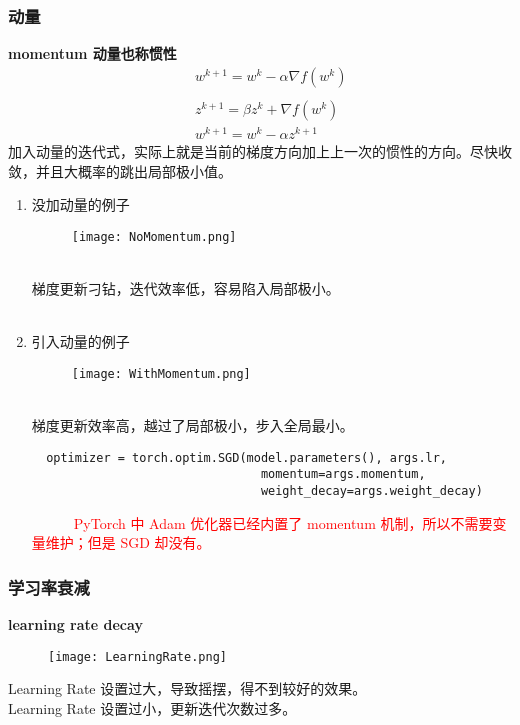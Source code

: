 \subsubsection{动量}
\textbf{momentum 动量也称惯性}
\begin{align*}
  &&w^{k+1}=w^{k}-\alpha\nabla f(w^k)\\
  &&\\
  &&z^{k+1}=\beta z^k + \nabla f(w^k)\\
  &&w^{k+1}=w^k-\alpha z^{k+1}
\end{align*}
加入动量的迭代式，实际上就是当前的梯度方向加上上一次的惯性的方向。尽快收敛，并且大概率的跳出局部极小值。

\begin{enumerate}
  \item 没加动量的例子\\
\begin{figure}[!h]
  \centering
  \texttt{[image: NoMomentum.png]}
\end{figure}\\
    梯度更新刁钻，迭代效率低，容易陷入局部极小。\\
    ~\\
  \item 引入动量的例子\\
  \begin{figure}[!h]
  \centering
  \texttt{[image: WithMomentum.png]}
\end{figure}\\
    梯度更新效率高，越过了局部极小，步入全局最小。
\begin{lstlisting}
  optimizer = torch.optim.SGD(model.parameters(), args.lr,
                                momentum=args.momentum,
                                weight_decay=args.weight_decay)
\end{lstlisting}
\textcolor{red}{~~~~~~PyTorch 中 Adam 优化器已经内置了 momentum 机制，所以不需要变量维护；但是 SGD 却没有。}
\end{enumerate}



\subsubsection{学习率衰减}
\textbf{learning rate decay}
\begin{figure}[!h]
  \centering
  \texttt{[image: LearningRate.png]}
\end{figure}

\noindent Learning Rate 设置过大，导致摇摆，得不到较好的效果。\\
Learning Rate 设置过小，更新迭代次数过多。

